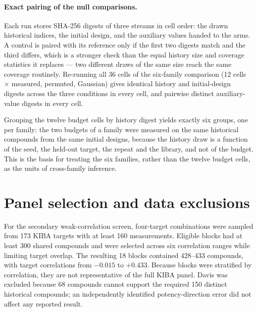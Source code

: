 \documentclass[10pt]{article}
\begin{document}
\paragraph{Exact pairing of the null comparisons.}
Each run stores SHA-256 digests of three streams in cell order: the drawn
historical indices, the initial design, and the auxiliary values handed to the
arms. A control is paired with its reference only if the first two digests
match and the third differs, which is a stronger check than the equal history
size and coverage statistics it replaces --- two different draws of the same
size reach the same coverage routinely. Re-running all 36 cells of the
six-family comparison (12 cells $\times$ measured, permuted, Gaussian) gives
identical history and initial-design digests across the three conditions in
every cell, and pairwise distinct auxiliary-value digests in every cell.

Grouping the twelve budget cells by history digest yields exactly six groups,
one per family: the two budgets of a family were measured on the same
historical compounds from the same initial designs, because the history draw
is a function of the seed, the held-out target, the repeat and the library,
and not of the budget. This is the basis for treating the six families, rather
than the twelve budget cells, as the units of cross-family inference.

\section{Panel selection and data exclusions}
\label{app:panel-screen}

For the secondary weak-correlation screen, four-target combinations were
sampled from 173 KIBA targets with at least 160 measurements. Eligible blocks
had at least 300 shared compounds and were selected across six correlation
ranges while limiting target overlap. The resulting 18 blocks contained
428--433 compounds, with target correlations from $-0.015$ to $+0.433$.
Because blocks were stratified by correlation, they are not representative of
the full KIBA panel. Davis was excluded because 68 compounds cannot support
the required 150 distinct historical compounds; an independently identified
potency-direction error did not affect any reported result.



\end{document}
